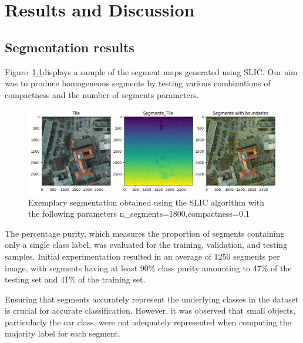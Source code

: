 \chapter{Results and Discussion}



\section{Segmentation results}
Figure~\ref{fig:Segmentation sample}displays a sample of the segment maps generated using SLIC. Our aim was to produce homogeneous segments by testing various combinations of compactness and the number of segments parameters.
 \begin{figure}[h]
    \centering
    \includegraphics[width=1\linewidth]{images/Segmentation sample.png}
    \caption{Exemplary segmentation obtained using the SLIC algorithm with the following parameters {n\_segments=1800,compactness=0.1}}
    \label{fig:Segmentation sample}
\end{figure}

The percentage purity, which measures the proportion of segments containing only a single class label, was evaluated for the training, validation, and testing samples. Initial experimentation resulted in an average of 1250 segments per image, with segments having at least 90\% class purity amounting to 47\% of the testing set and 41\% of the training set.


Ensuring that segments accurately represent the underlying classes in the dataset is crucial for accurate classification. However, it was observed that small objects, particularly the car class, were not adequately represented when computing the majority label for each segment.



